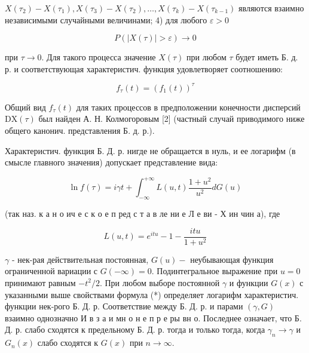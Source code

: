 \documentclass[10pt]{article}
\begin{document}
$X\left(\tau_{2}\right)-X\left(\tau_{1}\right), X\left(\tau_{3}\right)-X\left(\tau_{2}\right), \ldots, X\left(\tau_{k}\right)-X\left(\tau_{k-1}\right)$ являются взаимно независимыми случайными величинами; 4) для любого $\varepsilon>0$



\[

P(|X(\tau)|>\varepsilon) \longrightarrow 0

\]



при $\tau \rightarrow 0$. Для такого процесса значение $X(\tau)$ при любом $\tau$ будет иметь Б. д. р. и соответствующая характеристич. функция удовлетворяет соотношению:



\[

f_{\tau}(t)=\left(f_{1}(t)\right)^{\tau}

\]



Общий вид $f_{\tau}(t)$ для таких процессов в предположении конечности дисперсий $\mathrm{DX}(\tau)$ был найден А. Н. Колмогоровым [2] (частный случай приводимого ниже общего канонич. представления Б. д. р.).



Характеристич. функция Б. Д. р. нигде не обращается в нуль, и ее логарифм (в смысле главного значения) допускает представление вида:



\[

\ln f(\tau)=i \gamma t+\int_{-\infty}^{+\infty} L(u, t) \frac{1+u^{2}}{u^{2}} d G(u)

\]



(так наз. к а н о ич е с к о е п ред с т а в ле ни е Л е ви - Х ин чин а), где



\[

L(u, t)=e^{i t u}-1-\frac{i t u}{1+u^{2}}

\]



$\gamma$ - нек-рая действительная постоянная, $G(u)-$ неубывающая функция ограниченной вариации с $G(-\infty)=0$. Подинтегральное выражение при $u=0$ принимают равным $-t^{2} / 2$. При любом выборе постоянной $\gamma$ и функции $G(x)$ с указанными выше свойствами формула (*) определяет логарифм характеристич. функции нек-рого Б. Д. р. Соответствие между Б. Д. р. и парами $(\gamma, G)$ взаимно однозначно И в з а и мн о н е п р е ры вн о. Последнее означает, что Б. Д. р. слабо сходятся к предельному Б. Д. р. тогда и только тогда, когда $\gamma_{n} \rightarrow \gamma$ и $G_{n}(x)$ слабо сходятся к $G(x)$ при $n \rightarrow \infty$.
\end{document}
